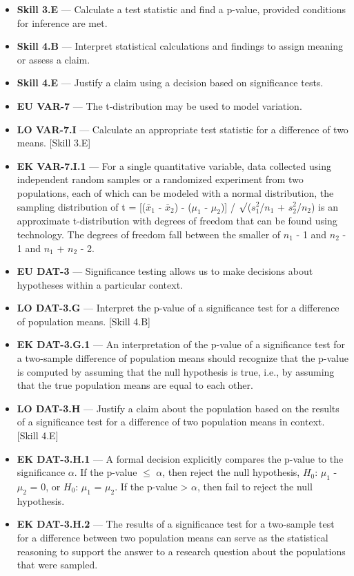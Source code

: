 \documentclass[11pt]{article}
\begin{document}


{\small
\begin{itemize}[leftmargin=1.5em,itemsep=2pt,topsep=2pt]
  \item \textbf{Skill 3.E} --- Calculate a test statistic and find a p-value, provided conditions for inference are met.
  \item \textbf{Skill 4.B} --- Interpret statistical calculations and findings to assign meaning or assess a claim.
  \item \textbf{Skill 4.E} --- Justify a claim using a decision based on significance tests.
  \item \textbf{EU VAR-7} --- The t-distribution may be used to model variation.
  \item \textbf{LO VAR-7.I} --- Calculate an appropriate test statistic for a difference of two means. [Skill 3.E]
  \item \textbf{EK VAR-7.I.1} --- For a single quantitative variable, data collected using independent random samples or a randomized experiment from two populations, each of which can be modeled with a normal distribution, the sampling distribution of t = [($\bar{x}_1$ - $\bar{x}_2$) - ($\mu_1$ - $\mu_2$)] / $\surd$($s_1^2$/$n_1$ + $s_2^2$/$n_2$) is an approximate t-distribution with degrees of freedom that can be found using technology. The degrees of freedom fall between the smaller of $n_1$ - 1 and $n_2$ - 1 and $n_1$ + $n_2$ - 2.
  \item \textbf{EU DAT-3} --- Significance testing allows us to make decisions about hypotheses within a particular context.
  \item \textbf{LO DAT-3.G} --- Interpret the p-value of a significance test for a difference of population means. [Skill 4.B]
  \item \textbf{EK DAT-3.G.1} --- An interpretation of the p-value of a significance test for a two-sample difference of population means should recognize that the p-value is computed by assuming that the null hypothesis is true, i.e., by assuming that the true population means are equal to each other.
  \item \textbf{LO DAT-3.H} --- Justify a claim about the population based on the results of a significance test for a difference of two population means in context. [Skill 4.E]
  \item \textbf{EK DAT-3.H.1} --- A formal decision explicitly compares the p-value to the significance $\alpha$. If the p-value $\leq$ $\alpha$, then reject the null hypothesis, $H_0$: $\mu_1$ - $\mu_2$ = 0, or $H_0$: $\mu_1$ = $\mu_2$. If the p-value > $\alpha$, then fail to reject the null hypothesis.
  \item \textbf{EK DAT-3.H.2} --- The results of a significance test for a two-sample test for a difference between two population means can serve as the statistical reasoning to support the answer to a research question about the populations that were sampled.
\end{itemize}
}
\end{document}
